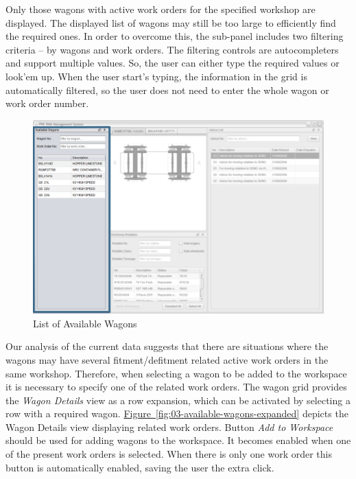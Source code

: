 Only those wagons with active work orders for the specified workshop are displayed. The displayed list of wagons may still be too large to efficiently find the required ones. In order to overcome this, the sub-panel includes two filtering criteria -- by wagons and work orders. The filtering controls are autocompleters and support multiple values. So, the user can either type the required values or look'em up. When the user start's typing, the information in the grid is automatically filtered, so the user does not need to enter the whole wagon or work order number.
\begin{figure}[!h]
\centering
\includegraphics[scale=0.37]{chapters/01-user-interface/images/02-available-wagons.png}
\caption{List of Available Wagons}\label{fig:02-available-wagons}
\end{figure}

Our analysis of the current data suggests that there are situations where the wagons may have several fitment/defitment related active work orders in the same workshop. Therefore, when selecting a wagon to be added to the workspace it is necessary to specify one of the related work orders. The wagon grid provides the \emph{Wagon Details} view as a row expansion, which can be activated by selecting a row with a required wagon. \hyperref[fig:03-available-wagons-expanded]{Figure~\ref*{fig:03-available-wagons-expanded}} depicts the Wagon Details view displaying related work orders. Button \emph{Add to Workspace} should be used for adding wagons to the workspace. It becomes enabled when one of the present work orders is selected. When there is only one work order this button is automatically enabled, saving the user the extra click.

